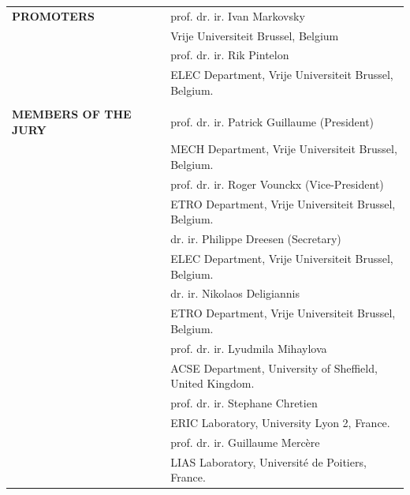 \documentclass[english,british,BCOR=5mm,DIV=12,fontsize=10pt]{scrbook}
\begin{document}
{	\begin{tabular}{@{}lll@{}}
	\textbf{\small PROMOTERS}		& &	{\small prof. dr. ir. Ivan Markovsky}				\\
				& &		{\footnotesize{}Vrije Universiteit Brussel, Belgium}\\[0.3em]
				& &	\small prof. dr. ir. Rik Pintelon				\\
				& &		{\footnotesize{}ELEC Department, Vrije Universiteit Brussel, Belgium.}	\\[0.3em]
				\\
	\textbf{\small MEMBERS OF THE JURY}	&	&\small prof. dr. ir. Patrick Guillaume (President)		\\
				&	&{\footnotesize{}MECH Department, Vrije Universiteit Brussel, Belgium.}	\\[0.3em]
				&	&\small prof. dr. ir. Roger Vounckx (Vice-President)				\\
				&	&{\footnotesize{}ETRO Department, Vrije Universiteit Brussel, Belgium.}	\\[0.3em]
				&	&\small dr. ir. Philippe Dreesen (Secretary)					\\
				&	&{\footnotesize{}ELEC Department, Vrije Universiteit Brussel, Belgium.}				\\[0.3em]
				&	&\small dr. ir. Nikolaos Deligiannis \\
				&	&{\footnotesize{}ETRO Department, Vrije Universiteit Brussel, Belgium.} 			\\[0.3em]
				&	&\small prof. dr. ir. Lyudmila Mihaylova 		\\
				&	&{\footnotesize{}ACSE Department, University of Sheffield, United Kingdom.} \\
				&	&\small prof. dr. ir. Stephane Chretien  		\\
				&	&{\footnotesize{}ERIC Laboratory, University Lyon 2, France.} \\
				&	&\small prof. dr. ir. Guillaume  Merc\`ere 		\\
				&	&{\footnotesize{}LIAS Laboratory, Universit\'e de Poitiers, France.} \\
\end{tabular}

}
\end{document}
